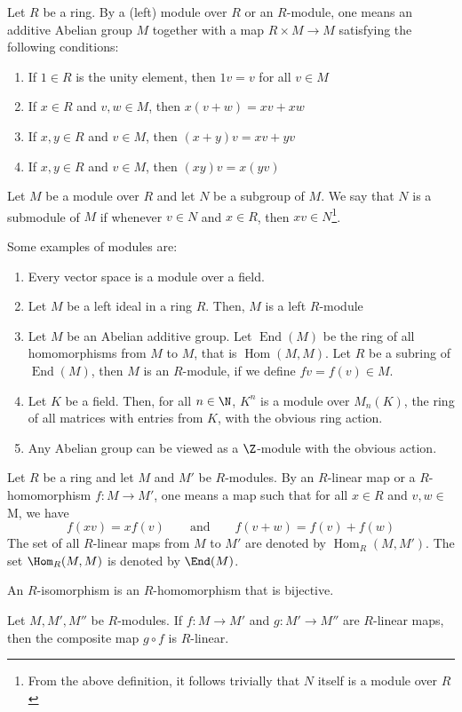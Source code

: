 \begin{definition}[Module]
    Let $R$ be a ring. By a (left) module over $R$ or an $R$-module, one means an additive Abelian group $M$ together with a map $R\times M\to M$ satisfying the following conditions: 
    \begin{enumerate}
        \item If $1\in R$ is the unity element, then $1v = v$ for all $v\in M$
        \item If $x\in R$ and $v,w\in M$, then $x(v + w) = xv + xw$ 
        \item If $x,y\in R$ and $v\in M$, then $(x + y)v = xv + yv$ 
        \item If $x,y\in R$ and $v\in M$, then $(xy)v = x(yv)$
    \end{enumerate}
\end{definition}

\begin{definition}[Submodule]
    Let $M$ be a module over $R$ and let $N$ be a subgroup of $M$. We say that $N$ is a submodule of $M$ if whenever $v\in N$ and $x\in R$, then $xv\in N$\footnote{From the above definition, it follows trivially that $N$ itself is a module over $R$}.
\end{definition}

Some examples of modules are: 
\begin{enumerate}
    \item Every vector space is a module over a field.
    \item Let $M$ be a left ideal in a ring $R$. Then, $M$ is a left $R$-module
    \item Let $M$ be an Abelian additive group. Let $\operatorname{End}(M)$ be the ring of all homomorphisms from $M$ to $M$, that is $\operatorname{Hom}(M, M)$. Let $R$ be a subring of $\operatorname{End}(M)$, then $M$ is an $R$-module, if we define $fv = f(v)\in M$.
    \item Let $K$ be a field. Then, for all $n\in\N$, $K^n$ is a module over $M_n(K)$, the ring of all matrices with entries from $K$, with the obvious ring action.
    \item Any Abelian group can be viewed as a $\Z$-module with the obvious action.
\end{enumerate}

\begin{definition}[Homomorphism]
    Let $R$ be a ring and let $M$ and $M'$ be $R$-modules. By an $R$-linear map or a $R$-homomorphism $f:M\to M'$, one means a map such that for all $x\in R$ and $v,w\in $M, we have 
    \begin{equation*}
        f(xv) = xf(v) \qquad\text{and}\qquad f(v + w) = f(v) + f(w)
    \end{equation*}
    The set of all $R$-linear maps from $M$ to $M'$ are denoted by $\operatorname{Hom}_R(M,M')$. The set $\Hom_R(M,M)$ is denoted by $\End(M)$.

    An $R$-isomorphism is an $R$-homomorphism that is bijective.
\end{definition}

\begin{proposition}
    Let $M, M', M''$ be $R$-modules. If $f:M\to M'$ and $g:M'\to M''$ are $R$-linear maps, then the composite map $g\circ f$ is $R$-linear.
\end{proposition}